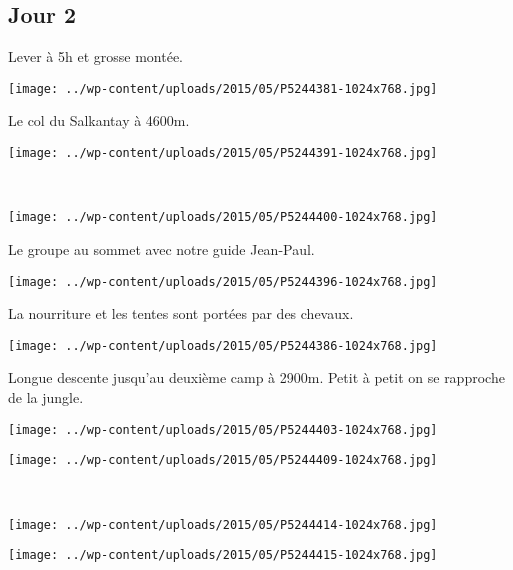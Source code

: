 \subsection*{Jour 2}
Lever à 5h et grosse montée. 
\begin{center} \texttt{[image: ../wp-content/uploads/2015/05/P5244381-1024x768.jpg]} \end{center}
\pagebreak

Le col du Salkantay à 4600m.
\begin{center} \texttt{[image: ../wp-content/uploads/2015/05/P5244391-1024x768.jpg]} \end{center}
~
\begin{center} \texttt{[image: ../wp-content/uploads/2015/05/P5244400-1024x768.jpg]} \end{center}
\vspace{-\topsep}
\pagebreak

Le groupe au sommet avec notre guide Jean-Paul. 
\begin{center} \texttt{[image: ../wp-content/uploads/2015/05/P5244396-1024x768.jpg]} \end{center}

La nourriture et les tentes sont portées par des chevaux. 
\begin{center} \texttt{[image: ../wp-content/uploads/2015/05/P5244386-1024x768.jpg]} \end{center}
\vspace{-\topsep}
\pagebreak

Longue descente jusqu'au deuxième camp à 2900m. Petit à petit on se rapproche de la jungle. 
\begin{center} \texttt{[image: ../wp-content/uploads/2015/05/P5244403-1024x768.jpg]} \end{center}
\begin{center} \texttt{[image: ../wp-content/uploads/2015/05/P5244409-1024x768.jpg]} \end{center}
\vspace{-\topsep}
\vspace{-2.75mm}
\pagebreak
~\\
\begin{center} \texttt{[image: ../wp-content/uploads/2015/05/P5244414-1024x768.jpg]} \end{center}
\begin{center} \texttt{[image: ../wp-content/uploads/2015/05/P5244415-1024x768.jpg]} \end{center}
\vspace{-\topsep}
\vspace{-2.75mm}
\pagebreak

